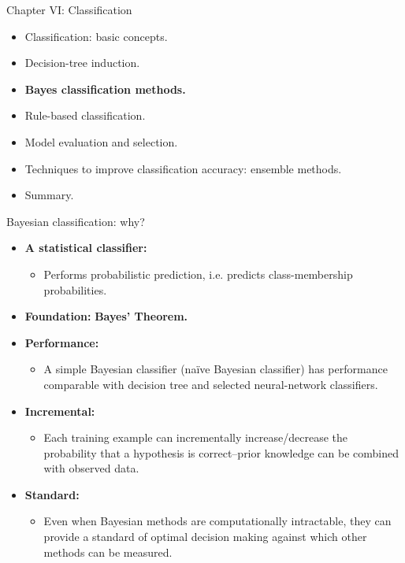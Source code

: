 \documentclass[aspectratio=169,t,table]{beamer}
\begin{document}
  {
    \begin{frame}{Chapter VI: Classification}
        \begin{itemize}
            \item Classification: basic concepts.
            \item Decision-tree induction.
            \item \textbf{Bayes classification methods.}
            \item Rule-based classification.
            \item Model evaluation and selection.
            \item Techniques to improve classification accuracy: ensemble methods.
            \item Summary.
        \end{itemize}
    \end{frame}
  }

  {
    \begin{frame}{Bayesian classification: why?}
        \begin{itemize}
            \item \textbf{A statistical classifier:}
            \begin{itemize}
              \item Performs probabilistic prediction, i.e. predicts class-membership probabilities.
            \end{itemize}
            \item \textbf{Foundation:} \textbf{\color{airforceblue}Bayes' Theorem.}
            \item \textbf{Performance:}
            \begin{itemize}
              \item A simple Bayesian classifier (naïve Bayesian classifier) has performance comparable with decision tree and selected neural-network classifiers.
            \end{itemize}
            \item \textbf{Incremental:}
            \begin{itemize}
              \item Each training example can incrementally increase/decrease the probability that a hypothesis is correct--prior knowledge can be combined with observed data.
            \end{itemize}
            \item \textbf{Standard:}
            \begin{itemize}
              \item Even when Bayesian methods are computationally intractable, they can provide a standard of optimal decision making against which other methods can be measured.
            \end{itemize}
        \end{itemize}
    \end{frame}
  }
\end{document}
